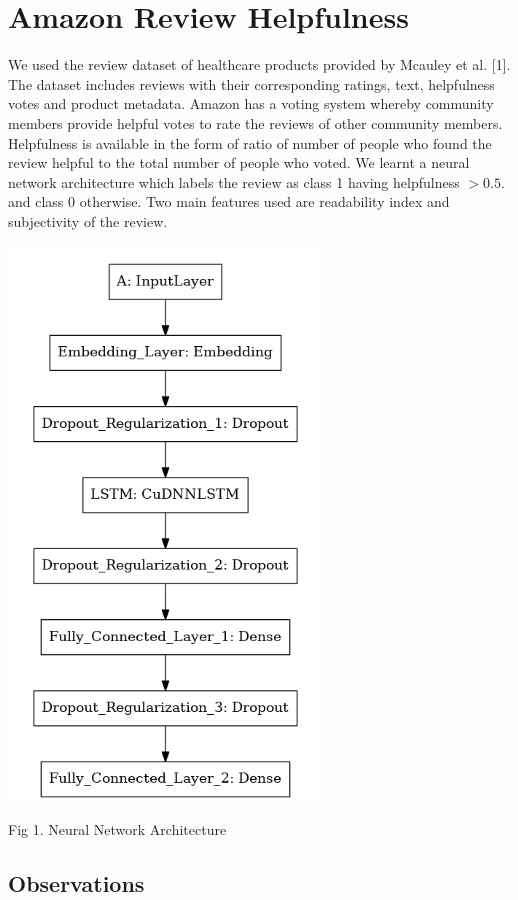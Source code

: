 \documentclass[12pt,journal,compsoc]{IEEEtran}
\begin{document}
\section{Amazon Review Helpfulness}
\noindent We used the review dataset of healthcare products provided by Mcauley et al. [1]. ​The dataset includes reviews with their corresponding ratings, text, helpfulness votes and product metadata. Amazon has a voting system whereby community members provide helpful votes to rate
the reviews of other community members. Helpfulness is available in the form of ratio of number of people who found the review helpful to the total number of people who voted.
We learnt a neural network architecture which labels the review as class 1 having helpfulness $> 0.5.$ and class 0 otherwise. Two main features used are readability index and subjectivity of the review.
\begin{center}
\includegraphics[scale=0.7]{Amazon_arch.PNG}

{\small Fig 1.  Neural Network Architecture}
\end{center}
\subsection{Observations}
\end{document}

